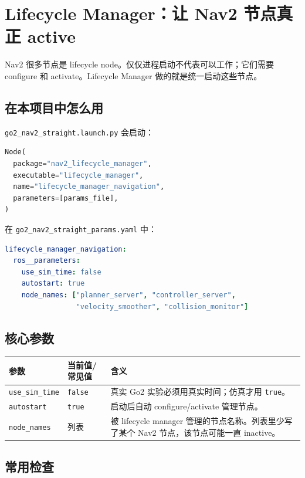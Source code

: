 \documentclass[UTF8,11pt,a4paper,openany]{ctexrep}
\newcommand{\code}[1]{\nolinkurl{#1}}
\newcommand{\param}[1]{\nolinkurl{#1}}
\newcommand{\file}[1]{\nolinkurl{#1}}
\begin{document}
\section{Lifecycle Manager：让 Nav2 节点真正 active}

Nav2 很多节点是 lifecycle node。仅仅进程启动不代表可以工作；它们需要 configure 和 activate。Lifecycle Manager 做的就是统一启动这些节点。

\subsection{在本项目中怎么用}

\file{go2_nav2_straight.launch.py} 会启动：

\begin{lstlisting}[language=Python]
Node(
  package="nav2_lifecycle_manager",
  executable="lifecycle_manager",
  name="lifecycle_manager_navigation",
  parameters=[params_file],
)
\end{lstlisting}

在 \file{go2_nav2_straight_params.yaml} 中：

\begin{lstlisting}[language=yaml]
lifecycle_manager_navigation:
  ros__parameters:
    use_sim_time: false
    autostart: true
    node_names: ["planner_server", "controller_server",
                 "velocity_smoother", "collision_monitor"]
\end{lstlisting}

\subsection{核心参数}

\begin{longtable}{L{0.26\textwidth}L{0.24\textwidth}L{0.40\textwidth}}
\toprule
参数 & 当前值/常见值 & 含义 \\
\midrule
\param{use_sim_time} & \code{false} & 真实 Go2 实验必须用真实时间；仿真才用 \code{true}。 \\
\param{autostart} & \code{true} & 启动后自动 configure/activate 管理节点。 \\
\param{node_names} & 列表 & 被 lifecycle manager 管理的节点名称。列表里少写了某个 Nav2 节点，该节点可能一直 inactive。 \\
\bottomrule
\end{longtable}

\subsection{常用检查}
\end{document}
